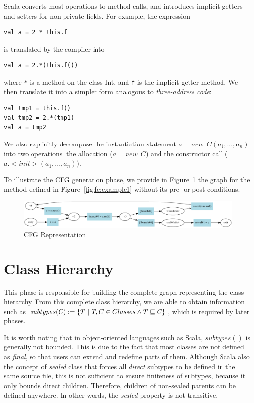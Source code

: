 Scala converts most operations to method calls, and introduces implicit getters
and setters for non-private fields. For example, the expression 
\begin{lstlisting}
val a = 2 * this.f
\end{lstlisting}
is translated by the compiler into 
\begin{lstlisting}
val a = 2.*(this.f())
\end{lstlisting}
where \verb/*/ is a method on the class Int, and \verb/f/ is the implicit
getter method. We then translate it into a simpler form analogous to
\emph{three-address code}:
\begin{lstlisting}
val tmp1 = this.f()
val tmp2 = 2.*(tmp1)
val a = tmp2
\end{lstlisting}

We also explicitly decompose the instantiation statement $a = new~~ C(a_1, ...,
a_n)$ into two operations: the allocation ($a = new~~ C$) and the constructor
call ($a.<init>(a_1, ..., a_n)$).

To illustrate the CFG generation phase, we provide in
Figure~\ref{fig:cfg:example1} the graph for the method defined in
Figure~\ref{fig:fe:example1} without its pre- or post-conditions.

\begin{figure}[h]
    \centering

    \includegraphics[scale=0.40]{images/cfg_example1} %

    \caption{CFG Representation}
    \label{fig:cfg:example1}
\end{figure}

\section{Class Hierarchy}
This phase is responsible for building the complete graph representing the
class hierarchy. From this complete class hierarchy, we are able to obtain
information such as $subtypes(C) := \{ T ~|~ T,C \in Classes \land T \sqsubseteq
C \}$, which is required by later phases.

It is worth noting that in object-oriented languages such as Scala,
$subtypes()$ is generally not bounded. This is due to the fact that most
classes are not defined as \emph{final}, so that users can extend and redefine
parts of them. Although Scala also the concept of \emph{sealed} class that forces
all \emph{direct} subtypes to be defined in the same source file, this 
is not sufficient to ensure finiteness of subtypes, because it only bounds
direct children. Therefore, children of non-sealed parents can be defined
anywhere. In other words, the \emph{sealed} property is not transitive.

